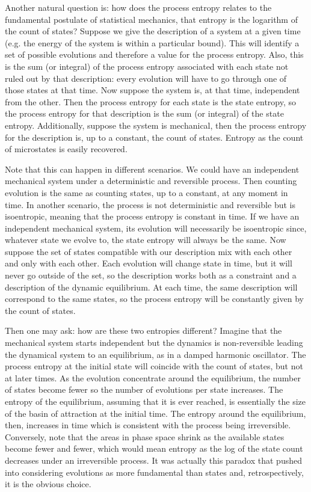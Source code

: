 \documentclass[letterpaper,twocolumn]{article}
\begin{document}
Another natural question is: how does the process entropy relates to the fundamental postulate of statistical mechanics, that entropy is the logarithm of the count of states?
Suppose we give the description of a system at a given time (e.g. the energy of the system is within a particular bound). This will identify a set of possible evolutions and therefore a value for the process entropy. Also, this is the sum (or integral) of the process entropy associated with each state not ruled out by that description: every evolution will have to go through one of those states at that time. Now suppose the system is, at that time, independent from the other. Then the process entropy for each state is the state entropy, so the process entropy for that description is the sum (or integral) of the state entropy. Additionally, suppose the system is mechanical, then the process entropy for the description is, up to a constant, the count of states. Entropy as the count of microstates is easily recovered.

Note that this can happen in different scenarios. We could have an independent mechanical system under a deterministic and reversible process. Then counting evolution is the same as counting states, up to a constant, at any moment in time. In another scenario, the process is not deterministic and reversible but is isoentropic, meaning that the process entropy is constant in time. If we have an independent mechanical system, its evolution will necessarily be isoentropic since, whatever state we evolve to, the state entropy will always be the same. Now suppose the set of states compatible with our description mix with each other and only with each other. Each evolution will change state in time, but it will never go outside of the set, so the description works both as a constraint and a description of the dynamic equilibrium. At each time, the same description will correspond to the same states, so the process entropy will be constantly given by the count of states.

Then one may ask: how are these two entropies different? Imagine that the mechanical system starts independent but the dynamics is non-reversible leading the dynamical system to an equilibrium, as in a damped harmonic oscillator. The process entropy at the initial state will coincide with the count of states, but not at later times. As the evolution concentrate around the equilibrium, the number of states become fewer so the number of evolutions per state increases. The entropy of the equilibrium, assuming that it is ever reached, is essentially the size of the basin of attraction at the initial time. The entropy around the equilibrium, then, increases in time which is consistent with the process being irreversible. Conversely, note that the areas in phase space shrink as the available states become fewer and fewer, which would mean entropy as the log of the state count decreases under an irreversible process. It was actually this paradox that pushed into considering evolutions as more fundamental than states and, retrospectively, it is the obvious choice.
\end{document}

